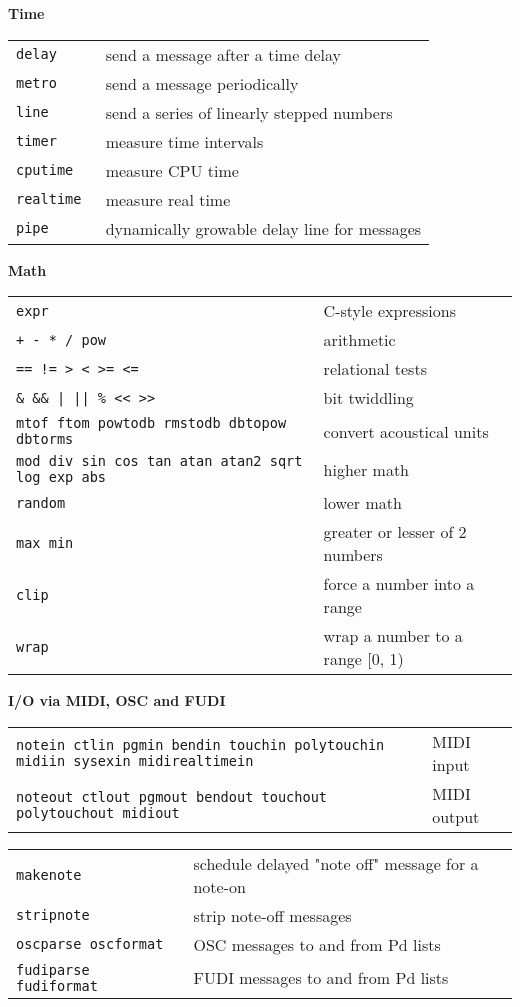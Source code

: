 \documentclass[a4paper, landscape, 9pt]{extarticle}
\newcommand{\refcardtitle}[1]{
  \begin{center}
    \textbf{\small{#1}}
  \end{center}
}
\begin{document}
\begin{multicols}{3}
  \refcardtitle{Time}
  \begin{tabularx}{9cm}{>{\tt}l X}
    delay & send a message after a time delay \\
    metro & send a message periodically \\
    line & send a series of linearly stepped numbers \\
    timer & measure time intervals \\
    cputime & measure CPU time \\
    realtime & measure real time \\
    pipe & dynamically growable delay line for messages \\
  \end{tabularx}

  \refcardtitle{Math}
  \begin{tabularx}{9cm}{>{\tt}X X}
  	expr & C-style expressions \\
  	+ - * / pow  & arithmetic \\
    == != > < >= <= & relational tests \\
    \& \&\& | || \% << >> & bit twiddling \\
    mtof ftom powtodb rmstodb dbtopow dbtorms & convert acoustical units \\
    mod div sin cos tan atan atan2 sqrt log exp abs & higher math \\
    random & lower math \\ 
    max min & greater or lesser of 2 numbers \\
    clip & force a number into a range \\
    wrap & wrap a number to a range [0, 1)
  \end{tabularx}
  
  
  \refcardtitle{I/O via MIDI, OSC and FUDI}
  \begin{tabularx}{9cm}{>{\tt}X X}
    notein ctlin pgmin bendin touchin polytouchin midiin sysexin midirealtimein & MIDI input \\
    noteout ctlout pgmout bendout touchout polytouchout midiout & MIDI output \\
  \end{tabularx}
  \begin{tabularx}{9cm}{>{\tt}X X}
    makenote & schedule delayed "note off" message for a note-on \\
    stripnote & strip note-off messages \\
    oscparse oscformat & OSC messages to and from Pd lists \\
    fudiparse fudiformat & FUDI messages to and from Pd lists \\
  \end{tabularx}


\end{multicols}
\end{document}
